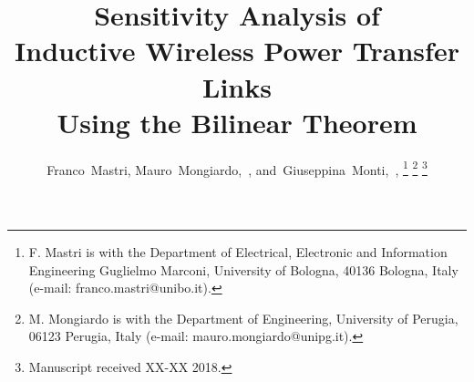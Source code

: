 \documentclass[journal]{IEEEtran}
\begin{document}
%
\title{Sensitivity Analysis of \\  Inductive Wireless Power Transfer Links\\ Using the Bilinear Theorem}
%
%
%

	
\author{
        Franco~Mastri,
        Mauro~Mongiardo,~,
        and~Giuseppina~Monti,~,
\thanks{ F. Mastri is with the Department of Electrical, Electronic and Information Engineering Guglielmo Marconi, University of Bologna, 40136 Bologna, Italy (e-mail: 
franco.mastri@unibo.it).}
\thanks{M. Mongiardo is with the Department of Engineering, University of Perugia, 06123 Perugia, Italy (e-mail: mauro.mongiardo@unipg.it).}
\thanks{Manuscript received XX-XX 2018.}}

% 
%
\end{document}

